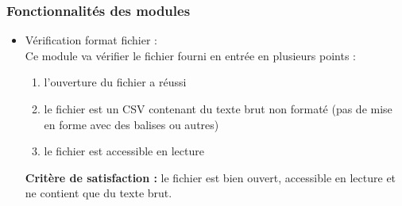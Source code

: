			\subsubsection{Fonctionnalités des modules}
			
			\begin{itemize}
			\item Vérification format fichier :\\
				Ce module va vérifier le fichier fourni en entrée en plusieurs points :
				\begin{enumerate}
					\item l'ouverture du fichier a réussi
					\item le fichier est un CSV contenant du texte brut non formaté (pas de mise en forme avec des balises ou autres)
					\item le fichier est accessible en lecture
				\end{enumerate}
				\textbf{Critère de satisfaction : } le fichier est bien ouvert, accessible en lecture et ne contient que du texte brut.
			

\end{itemize}

